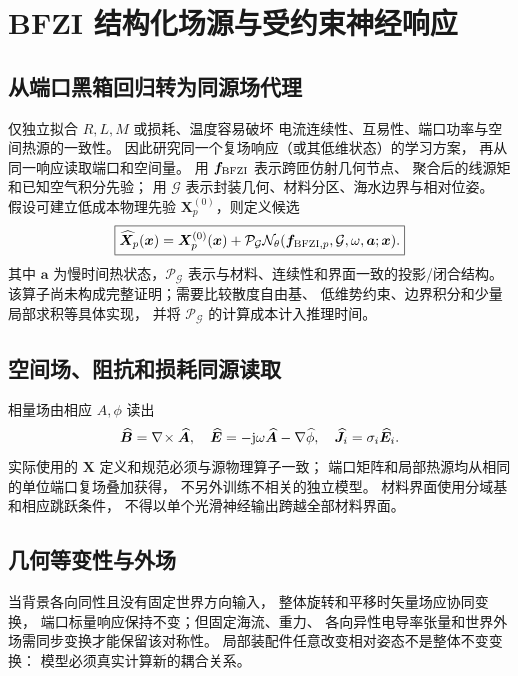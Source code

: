 \section{BFZI 结构化场源与受约束神经响应}\label{sec:surrogate}
\subsection{从端口黑箱回归转为同源场代理}
仅独立拟合 \(R,L,M\) 或损耗、温度容易破坏
电流连续性、互易性、端口功率与空间热源的一致性。
因此研究同一个复场响应（或其低维状态）的学习方案，
再从同一响应读取端口和空间量。
用 \(\bm f_{\rm BFZI}\) 表示跨匝仿射几何节点、
聚合后的线源矩和已知空气积分先验；
用 \(\mathcal G\) 表示封装几何、材料分区、海水边界与相对位姿。
假设可建立低成本物理先验 \(\bm X_p^{(0)}\)，则定义候选
\begin{equation}
\boxed{
\widehat{\bm X}_p(\bm x)
=\bm X_p^{(0)}(\bm x)+
\mathcal P_{\mathcal G}
\mathcal N_\theta(\bm f_{{\rm BFZI},p},\mathcal G,\omega,\bm a;\bm x).
}
\end{equation}
其中 \(\bm a\) 为慢时间热状态，\(\mathcal P_{\mathcal G}\)
表示与材料、连续性和界面一致的投影/闭合结构。
该算子尚未构成完整证明；需要比较散度自由基、
低维势约束、边界积分和少量局部求积等具体实现，
并将 \(\mathcal P_{\mathcal G}\) 的计算成本计入推理时间。

\subsection{空间场、阻抗和损耗同源读取}
相量场由相应 \(A,\phi\) 读出
\[
\widehat{\bm B}=\nabla\!\times\widehat{\bm A},\quad
\widehat{\bm E}=-\mathrm j\omega\widehat{\bm A}-\nabla\widehat\phi,\quad
\widehat{\bm J}_i=\sigma_i\widehat{\bm E}_i.
\]
实际使用的 \(\bm X\) 定义和规范必须与源物理算子一致；
端口矩阵和局部热源均从相同的单位端口复场叠加获得，
不另外训练不相关的独立模型。
材料界面使用分域基和相应跳跃条件，
不得以单个光滑神经输出跨越全部材料界面。

\subsection{几何等变性与外场}
当背景各向同性且没有固定世界方向输入，
整体旋转和平移时矢量场应协同变换，
端口标量响应保持不变；但固定海流、重力、
各向异性电导率张量和世界外场需同步变换才能保留该对称性。
局部装配件任意改变相对姿态不是整体不变变换：
模型必须真实计算新的耦合关系。
